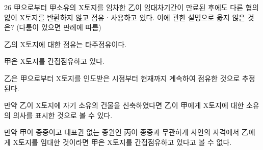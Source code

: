 \begin{question}{26}
甲으로부터 甲소유의 X토지를 임차한 乙이 임대차기간이 만료된 후에도 다른 협의 없이 X토지를 반환하지 않고 점유ㆍ사용하고 있다. 이에 관한 설명으로 옳지 않은 것은? (다툼이 있으면 판례에 따름)
\begin{choices}
  \item 乙의 X토지에 대한 점유는 타주점유이다.
  \item 甲은 X토지를 간접점유하고 있다.
  \item 乙은 甲으로부터 X토지를 인도받은 시점부터 현재까지 계속하여 점유한 것으로 추정된다.
  \item 만약 乙이 X토지에 자기 소유의 건물을 신축하였다면 乙이 甲에게 X토지에 대한 소유의 의사를 표시한 것으로 볼 수 있다.
  \item 만약 甲이 종중이고 대표권 없는 종원인 丙이 종중과 무관하게 사인의 자격에서 乙에게 X토지를 임대한 것이라면 甲은 X토지를 간접점유하고 있다고 볼 수 없다.
\end{choices}
\end{question}
